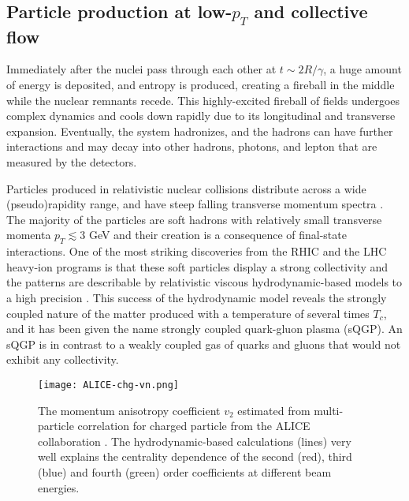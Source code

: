 \subsection{Particle production at low-$p_T$ and collective flow} 
Immediately after the nuclei pass through each other at $t\sim 2R/\gamma$, a huge amount of energy is deposited, and entropy is produced, creating a fireball in the middle while the nuclear remnants recede.
This highly-excited fireball of fields undergoes complex dynamics and cools down rapidly due to its longitudinal and transverse expansion.
Eventually, the system hadronizes, and the hadrons can have further interactions and may decay into other hadrons, photons, and lepton that are measured by the detectors.

Particles produced in relativistic nuclear collisions distribute across a wide (pseudo)rapidity range, and have steep falling transverse momentum spectra \cite{Adler:2003cb,Abelev:2012hxa,ALICE:2015kda}.
The majority of the particles are soft hadrons with relatively small transverse momenta $p_T \lesssim 3$ GeV and their creation is a consequence of final-state interactions.
One of the most striking discoveries from the RHIC and the LHC heavy-ion programs is that these soft particles display a strong collectivity and the patterns are describable by relativistic viscous hydrodynamic-based models to a high precision \cite{Dusling:2007gi,Song:2008si,Schenke:2010nt,Petersen:2008dd,Niemi:2015qia,Bernhard:2016tnd,Bernhard:2018hnz}.
This success of the hydrodynamic model reveals the strongly coupled nature of the matter produced with a temperature of several times $T_c$, and it has been given the name strongly coupled quark-gluon plasma (sQGP).
An sQGP is in contrast to a weakly coupled gas of quarks and gluons that would not exhibit any collectivity.


\begin{figure}
\singlespacing 
\centering
\texttt{[image: ALICE-chg-vn.png]}
\caption[The momentum anisotropy coefficient $v_2$ estimated from]{The momentum anisotropy coefficient $v_2$ estimated from multi-particle correlation for charged particle from the ALICE collaboration \cite{ALICE:2011ab,Adam:2016izf}.
The hydrodynamic-based calculations \cite{Niemi:2015voa,Noronha-Hostler:2015uye} (lines) very well explains the centrality dependence of the second (red), third (blue) and fourth (green) order coefficients at different beam energies.}
\label{fig:intro:vn}
\end{figure}

